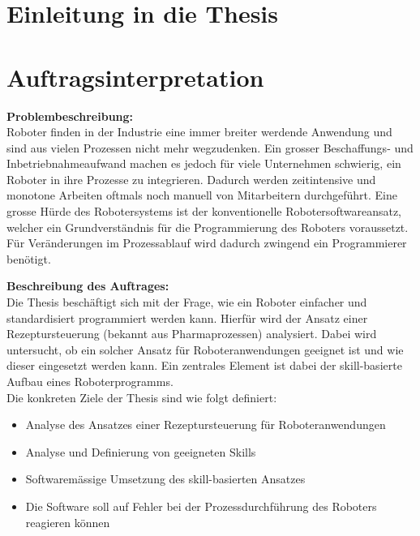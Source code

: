 \section{Einleitung in die Thesis} \label{Einleitung in die Thesis}
	
\newpage
\section{Auftragsinterpretation} \label{Auftragsinterpretation}

	\textbf{Problembeschreibung:} \vspace{2mm} 
	\\
	Roboter finden in der Industrie eine immer breiter werdende Anwendung und sind aus vielen Prozessen
	nicht mehr wegzudenken. Ein grosser Beschaffungs- und Inbetriebnahmeaufwand machen es jedoch
	für viele Unternehmen schwierig, ein Roboter in ihre Prozesse zu integrieren. Dadurch werden
	zeitintensive und monotone Arbeiten oftmals noch manuell von Mitarbeitern durchgeführt. Eine grosse
	Hürde des Robotersystems ist der konventionelle Robotersoftwareansatz, welcher ein Grundverständnis
	für die Programmierung des Roboters voraussetzt. Für Veränderungen im Prozessablauf wird dadurch
	zwingend ein Programmierer benötigt.
	\vspace{3mm}
	
	\textbf{Beschreibung des Auftrages:} \vspace{2mm} 
	\\
	Die Thesis beschäftigt sich mit der Frage, wie ein Roboter einfacher und standardisiert programmiert
	werden kann. Hierfür wird der Ansatz einer Rezeptursteuerung (bekannt aus Pharmaprozessen)
	analysiert. Dabei wird untersucht, ob ein solcher Ansatz für Roboteranwendungen geeignet ist und wie
	dieser eingesetzt werden kann. Ein zentrales Element ist dabei der skill-basierte Aufbau eines
	Roboterprogramms.
	\\
	\linebreak
	Die konkreten Ziele der Thesis sind wie folgt definiert:
	\begin{itemize}
		\item Analyse des Ansatzes einer Rezeptursteuerung für Roboteranwendungen
		\item Analyse und Definierung von geeigneten Skills
		\item Softwaremässige Umsetzung des skill-basierten Ansatzes
		\item Die Software soll auf Fehler bei der Prozessdurchführung des Roboters reagieren können
	\end{itemize}
	\addvspace{5mm}
	
